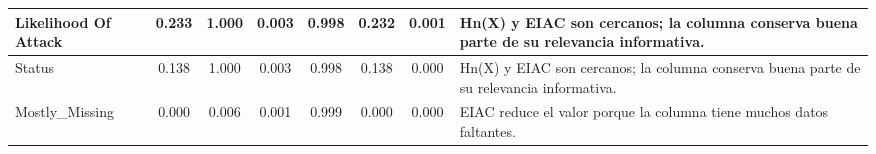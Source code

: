 \begin{table}[h]
\begin{tabular}{|p{3cm}|c|c|c|c|c|c|p{5cm}|}
\hline
Likelihood Of Attack & 0.233 & 1.000 & 0.003 & 0.998 & 0.232 & 0.001 & Hn(X) y EIAC son cercanos; la columna conserva buena parte de su relevancia informativa. \\
\hline
Status & 0.138 & 1.000 & 0.003 & 0.998 & 0.138 & 0.000 & Hn(X) y EIAC son cercanos; la columna conserva buena parte de su relevancia informativa. \\
\hline
Mostly\_Missing & 0.000 & 0.006 & 0.001 & 0.999 & 0.000 & 0.000 & EIAC reduce el valor porque la columna tiene muchos datos faltantes. \\
\hline
\end{tabular}
\end{table}
